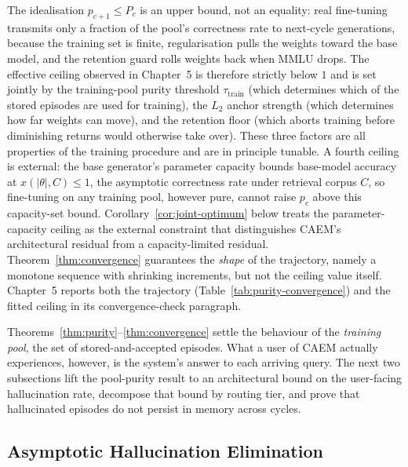 \begin{remark}
The idealisation $p_{c+1} \le P_c$ is an upper bound, not an equality: real fine-tuning transmits only a fraction of the pool's correctness rate to next-cycle generations, because the training set is finite, regularisation pulls the weights toward the base model, and the retention guard rolls weights back when MMLU drops. The effective ceiling observed in Chapter~5 is therefore strictly below $1$ and is set jointly by the training-pool purity threshold $\tau_{\text{train}}$ (which determines which of the stored episodes are used for training), the $L_2$ anchor strength (which determines how far weights can move), and the retention floor (which aborts training before diminishing returns would otherwise take over). These three factors are all properties of the training procedure and are in principle tunable. A fourth ceiling is external: the base generator's parameter capacity bounds base-model accuracy at $x(|\theta|, C) \leq 1$, the asymptotic correctness rate under retrieval corpus $C$, so fine-tuning on any training pool, however pure, cannot raise $p_{c}$ above this capacity-set bound. Corollary~\ref{cor:joint-optimum} below treats the parameter-capacity ceiling as the external constraint that distinguishes CAEM's architectural residual from a capacity-limited residual. Theorem~\ref{thm:convergence} guarantees the \emph{shape} of the trajectory, namely a monotone sequence with shrinking increments, but not the ceiling value itself. Chapter~5 reports both the trajectory (Table~\ref{tab:purity-convergence}) and the fitted ceiling in its convergence-check paragraph.
\end{remark}

Theorems~\ref{thm:purity}--\ref{thm:convergence} settle the behaviour of the \emph{training pool}, the set of stored-and-accepted episodes. What a user of CAEM actually experiences, however, is the system's answer to each arriving query. The next two subsections lift the pool-purity result to an architectural bound on the user-facing hallucination rate, decompose that bound by routing tier, and prove that hallucinated episodes do not persist in memory across cycles.

\subsection{Asymptotic Hallucination Elimination}
\label{sec:asymptotic-elimination}

